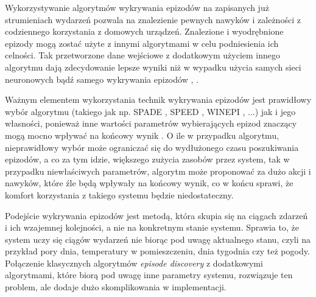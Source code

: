 Wykorzystywanie algorytmów wykrywania epizodów na zapisanych już strumieniach wydarzeń pozwala na znalezienie pewnych nawyków i zależności z codziennego korzystania z domowych urządzeń. Znalezione i wyodrębnione epizody mogą zostać użyte z innymi algorytmami w celu podniesienia ich celności. Tak przetworzone dane wejściowe z dodatkowym użyciem innego algorytmu dają zdecydowanie lepsze wyniki niż w wypadku użycia samych sieci neuronowych bądź samego wykrywania epizodów \cite{episode_discovery_1}, \cite{episode_discovery_2}. 


Ważnym elementem wykorzystania technik wykrywania epizodów jest prawidłowy wybór algorytmu (takiego jak np. SPADE \cite{SPADE}, SPEED \cite{SPEED}, WINEPI \cite{WINEPI}, ...) jak i jego własności, ponieważ inne wartości parametrów wybierających epizod znaczący mogą mocno wpływać na końcowy wynik \cite{episode_discovery_2}. O ile w przypadku algorytmu, nieprawidłowy wybór może ograniczać się do wydłużonego czasu poszukiwania epizodów, a co za tym idzie, większego zużycia zasobów przez system, tak w przypadku niewłaściwych parametrów, algorytm może proponować za dużo akcji i nawyków, które źle będą wpływały na końcowy wynik, co w końcu sprawi, że komfort korzystania z takiego systemu będzie niedostateczny.

Podejście wykrywania epizodów jest metodą, która skupia się na ciągach zdarzeń i ich wzajemnej kolejności, a nie na konkretnym stanie systemu. Sprawia to, że system uczy się ciągów wydarzeń nie biorąc pod uwagę aktualnego stanu, czyli na przykład pory dnia, temperatury w pomieszczeniu, dnia tygodnia czy też pogody. Połączenie klasycznych algorytmów \textit{episode discovery} z dodatkowymi algorytmami, które biorą pod uwagę inne parametry systemu, rozwiązuje ten problem, ale dodaje dużo skomplikowania w implementacji.

